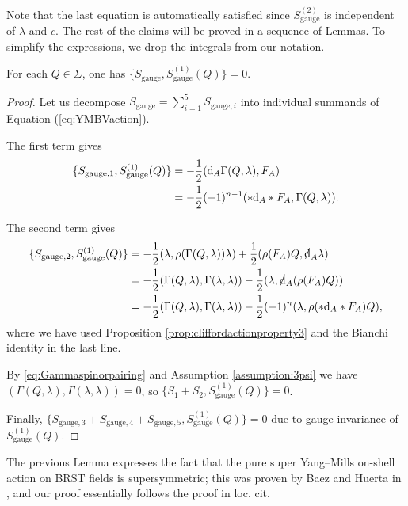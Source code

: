 \documentclass[10pt, oneside]{article}
\newcommand{\gauge}{\mathrm{gauge}}
\begin{document}
Note that the last equation is automatically satisfied since $S_{\gauge}^{(2)}$ is independent of $\lambda$ and $c$. The rest of the claims will be proved in a sequence of Lemmas. To simplify the expressions, we drop the integrals from our notation.

\begin{lemma}
For each $Q\in \Sigma$, one has $\{S_{\gauge}, S_{\gauge}^{(1)}(Q)\} = 0$.
\label{lm:gaugemultiplet1}
\end{lemma}
\begin{proof}
Let us decompose $S_{\gauge} = \sum_{i=1}^5 S_{\gauge, i}$ into individual summands of Equation (\ref{eq:YMBVaction}).

The first term gives
\begin{align*}
\{S_{\gauge, 1}, S_{\gauge}^{(1)}(Q)\} &= -\frac{1}{2} (\d_A \Gamma(Q, \lambda), F_A)\\
&= -\frac{1}{2}(-1)^{n-1} (\ast \d_A \ast F_A, \Gamma(Q, \lambda)).
\end{align*}

The second term gives
\begin{align*}
\{S_{\gauge, 2}, S_{\gauge}^{(1)}(Q)\} &= -\frac{1}{2}(\lambda, \rho(\Gamma(Q, \lambda))\lambda) + \frac{1}{2}(\rho(F_A) Q, \sd{\d}_A\lambda) \\
&= -\frac{1}{2}(\Gamma(Q, \lambda), \Gamma(\lambda, \lambda))  - \frac{1}{2}(\lambda, \sd{\d}_A(\rho(F_A) Q)) \\
&= -\frac{1}{2}(\Gamma(Q, \lambda), \Gamma(\lambda, \lambda)) - \frac{1}{2} (-1)^n (\lambda, \rho(\ast \d_A\ast F_A) Q),
\end{align*}
where we have used Proposition \ref{prop:cliffordactionproperty3} and the Bianchi identity in the last line.

By \eqref{eq:Gammaspinorpairing} and Assumption \ref{assumption:3psi} we have $(\Gamma(Q, \lambda), \Gamma(\lambda, \lambda)) = 0$, so $\{S_1 + S_2, S_{\gauge}^{(1)}(Q)\} = 0$.

Finally, $\{S_{\gauge,3} + S_{\gauge,4} + S_{\gauge, 5}, S_{\gauge}^{(1)}(Q)\} = 0$ due to gauge-invariance of $S_{\gauge}^{(1)}(Q)$.
\end{proof}

\begin{remark}
The previous Lemma expresses the fact that the pure super Yang--Mills on-shell action on BRST fields is supersymmetric; this was proven by Baez and Huerta in \cite{BaezHuerta}, and our proof essentially follows the proof in loc. cit.
\end{remark}
\end{document}
